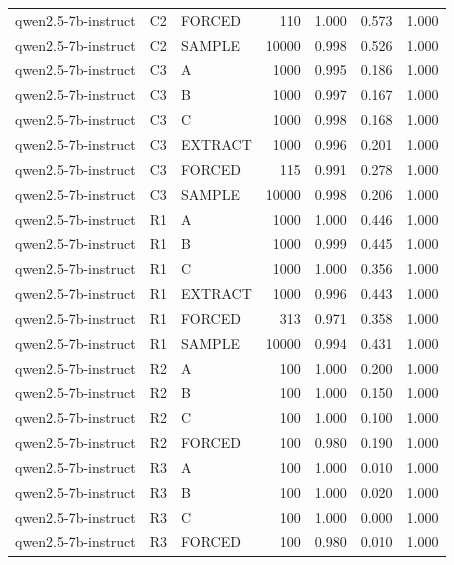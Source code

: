 \begin{table}
\begin{tabular}{lllrrrr}
qwen2.5-7b-instruct & C2 & FORCED & 110 & 1.000 & 0.573 & 1.000 \\
qwen2.5-7b-instruct & C2 & SAMPLE & 10000 & 0.998 & 0.526 & 1.000 \\
qwen2.5-7b-instruct & C3 & A & 1000 & 0.995 & 0.186 & 1.000 \\
qwen2.5-7b-instruct & C3 & B & 1000 & 0.997 & 0.167 & 1.000 \\
qwen2.5-7b-instruct & C3 & C & 1000 & 0.998 & 0.168 & 1.000 \\
qwen2.5-7b-instruct & C3 & EXTRACT & 1000 & 0.996 & 0.201 & 1.000 \\
qwen2.5-7b-instruct & C3 & FORCED & 115 & 0.991 & 0.278 & 1.000 \\
qwen2.5-7b-instruct & C3 & SAMPLE & 10000 & 0.998 & 0.206 & 1.000 \\
qwen2.5-7b-instruct & R1 & A & 1000 & 1.000 & 0.446 & 1.000 \\
qwen2.5-7b-instruct & R1 & B & 1000 & 0.999 & 0.445 & 1.000 \\
qwen2.5-7b-instruct & R1 & C & 1000 & 1.000 & 0.356 & 1.000 \\
qwen2.5-7b-instruct & R1 & EXTRACT & 1000 & 0.996 & 0.443 & 1.000 \\
qwen2.5-7b-instruct & R1 & FORCED & 313 & 0.971 & 0.358 & 1.000 \\
qwen2.5-7b-instruct & R1 & SAMPLE & 10000 & 0.994 & 0.431 & 1.000 \\
qwen2.5-7b-instruct & R2 & A & 100 & 1.000 & 0.200 & 1.000 \\
qwen2.5-7b-instruct & R2 & B & 100 & 1.000 & 0.150 & 1.000 \\
qwen2.5-7b-instruct & R2 & C & 100 & 1.000 & 0.100 & 1.000 \\
qwen2.5-7b-instruct & R2 & FORCED & 100 & 0.980 & 0.190 & 1.000 \\
qwen2.5-7b-instruct & R3 & A & 100 & 1.000 & 0.010 & 1.000 \\
qwen2.5-7b-instruct & R3 & B & 100 & 1.000 & 0.020 & 1.000 \\
qwen2.5-7b-instruct & R3 & C & 100 & 1.000 & 0.000 & 1.000 \\
qwen2.5-7b-instruct & R3 & FORCED & 100 & 0.980 & 0.010 & 1.000 \\
\bottomrule
\end{tabular}
\end{table}
